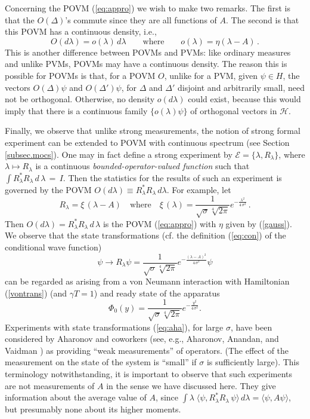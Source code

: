 \documentclass[12pt]{article}
\newcommand{\eq}[1]{(\ref{#1})}
\newcommand{\cwf}{conditional wave function}
\renewcommand{\dagger}{\ast}
\newcommand{\id}{I}
\newcommand{\lam}{\lambda}
\renewcommand{\H}{\mbox{$\mathcal{H}$}}
\newcommand{\Al}{R_{\lambda}}
\newcommand{\Ald}{R^{\dagger}_{\lambda}}
\newcommand{\Ex}{\mbox{$\mathcal{E}$}}
\begin{document}
Concerning the POVM (\ref{eq:appro}) we wish to make two remarks.  The
first is that the $O(\Delta)$'s commute since they are all functions
of $A$.  The second is that this POVM has a continuous density, i.e.,
$$
O(d\lambda) = o(\lambda)\, d\lambda\qquad\mbox{where}\qquad
o(\lambda)= \eta(\lambda -A)\,. $$
This is another difference between
POVMs and PVMs: like ordinary measures and unlike PVMs, POVMs may have
a continuous density. The reason this is possible for POVMs is that,
for a POVM $O$, unlike for a PVM, given $\psi\in H$, the vectors $
O(\Delta)\psi$ and $ O(\Delta ')\psi$, for $\Delta$ and $\Delta '$
disjoint and arbitrarily small, need not be orthogonal.  Otherwise, no
density $o(d\lambda)$ could exist, because this would imply that there
is a continuous family $\{o(\lambda)\psi\}$ of orthogonal vectors in
$\H$.

Finally, we observe that unlike strong measurements, the notion of
strong formal experiment can be extended to POVM with continuous
spectrum (see Section \ref{subsec.mocs}).  One may in fact define a
strong experiment by $\Ex =\{\lambda, R_{\lambda}\}$, where $\lam
\mapsto\Al$ is a continuous \emph{bounded-operator-valued function}
such that $\int \Ald \Al \,d\,\lam \,=\,\id $.  Then the statistics
for the results of such an experiment is governed by the POVM
$O(d\lam) \equiv \Ald \Al\, d\lam$.  For example, let
$$
R_\lambda = \xi\, ( \lambda -A) \quad\mbox{where}\quad \xi\,
(\lambda) = \frac{1}{\sqrt{\sigma}\sqrt[4]{2\pi}}
e^{-\frac{\lambda^2}{4\,\sigma^2}}\,.
$$
Then $O(d\lambda) = \Ald \Al \,d\,\lam$ is the POVM
(\ref{eq:appro}) with $\eta$ given by (\ref{gauss}).  We observe that
the state transformations (cf. the definition \eq{eq:con} of the
\cwf{})
\begin{equation}
\psi \to  R_{\lam}\psi= \frac{1}{\sqrt{\sigma}\sqrt[4]{2\pi}}
e^{-\frac{(\lambda -A)^2}{4\,\sigma^2}} \psi
\label{eq:aha}
\end{equation}
can be regarded as arising {}from a von Neumann interaction with
Hamiltonian (\ref{vontrans}) (and $\gamma T=1$) and ready state of the
apparatus
$$
\Phi_{0}(y) = \frac{1}{\sqrt{\sigma}\sqrt[4]{2\pi}}
e^{-\frac{y^2}{4\,\sigma^2}}.
$$
Experiments with state transformations (\ref{eq:aha}), for large
$\sigma$, have been considered by Aharonov and coworkers (see, e.g.,
Aharonov, Anandan, and Vaidman \cite{AAV93}) as providing ``weak
measurements'' of operators. (The effect of the measurement on the
state of the system is ``small'' if $\sigma$ is sufficiently large).
This terminology notwithstanding, it is important to observe that such
experiments are not measurements of $A$ in the sense we have discussed
here.  They give information about the average value of $A$, since $
\int \lam\;\langle \psi,\Ald \Al\, \psi\rangle\,d\lam = \langle\psi,
A\psi\rangle $, but presumably none about its higher moments.
\end{document}

